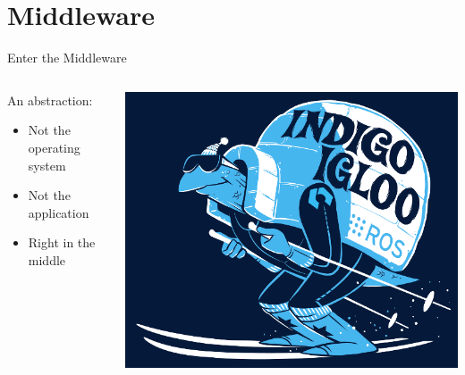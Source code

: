 \documentclass[aspectratio=43]{beamer}
\begin{document}
\section{Middleware}
\begin{frame}{Enter the Middleware}
\begin{columns}
	\begin{column}{0.55\textwidth}
An abstraction:
		\begin{itemize}
			\item Not the operating system
                        \item Not the application
                        \item Right in the middle
		\end{itemize} \end{column} \begin{column}{0.45\textwidth} \centering \includegraphics[width=\textwidth]{fig/indigoigloo_600.png} \end{column}
\end{columns}

\end{frame}
\end{document}
